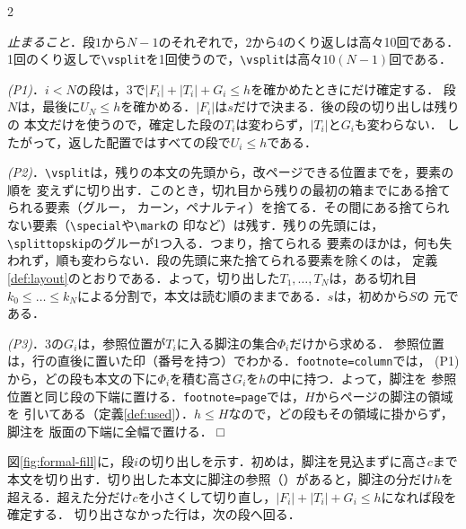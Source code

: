 \documentclass[paper=a4,fontsize=10pt]{jlreq}
\newcommand\cs[1]{\texttt{\textbackslash #1}}
\newcommand\opt[1]{\texttt{#1}}
\newcommand\kyocho[1]{{\gtfamily\itshape #1}}
\newenvironment{shoumei}{%
  \par\noindent{\gtfamily\sffamily 証明}\hspace{1\zw}\ignorespaces}
  {\unskip\nobreak\hfill □\par\addvspace{.5\baselineskip}}
\begin{document}
\begin{multicols}{2}
\begin{shoumei}
\kyocho{止まること}．段$1$から$N-1$のそれぞれで，2から4のくり返しは高々10回である．
1回のくり返しで\cs{vsplit}を1回使うので，\cs{vsplit}は高々$10(N-1)$回である．

\kyocho{(P1)}．$i<N$の段は，3で$|F_i|+|T_i|+G_i\le h$を確かめたときにだけ確定する．
段$N$は，最後に$U_N\le h$を確かめる．$|F_i|$は$s$だけで決まる．後の段の切り出しは残りの
本文だけを使うので，確定した段の$T_i$は変わらず，$|T_i|$と$G_i$も変わらない．
したがって，返した配置ではすべての段で$U_i\le h$である．

\kyocho{(P2)}．\cs{vsplit}は，残りの本文の先頭から，改ページできる位置までを，要素の順を
変えずに切り出す．このとき，切れ目から残りの最初の箱までにある捨てられる要素（グルー，
カーン，ペナルティ）を捨てる．その間にある捨てられない要素（\cs{special}や\cs{mark}の
印など）は残す．残りの先頭には，\cs{splittopskip}のグルーが1つ入る．つまり，捨てられる
要素のほかは，何も失われず，順も変わらない．段の先頭に来た捨てられる要素を除くのは，
定義\ref{def:layout}のとおりである．よって，切り出した$T_1,\dots,T_N$は，ある切れ目
$k_0\le\dots\le k_N$による分割で，本文は読む順のままである．$s$は，初めから$S$の
元である．

\kyocho{(P3)}．3の$G_i$は，参照位置が$T_i$に入る脚注の集合$\Phi_i$だけから求める．
参照位置は，行の直後に置いた印（番号を持つ）でわかる．\opt{footnote=column}では，
(P1)から，どの段も本文の下に$\Phi_i$を積む高さ$G_i$を$h$の中に持つ．よって，脚注を
参照位置と同じ段の下端に置ける．\opt{footnote=page}では，$H$からページの脚注の領域を
引いてある（定義\ref{def:used}）．$h\le H$なので，どの段もその領域に掛からず，脚注を
版面の下端に全幅で置ける．
\end{shoumei}
\end{multicols}

図\ref{fig:formal-fill}に，段$i$の切り出しを示す．初めは，脚注を見込まずに高さ$c$まで
本文を切り出す．切り出した本文に脚注の参照（\textdagger）があると，脚注の分だけ$h$を
超える．超えた分だけ$c$を小さくして切り直し，$|F_i|+|T_i|+G_i\le h$になれば段を確定する．
切り出さなかった行は，次の段へ回る．
\end{document}
